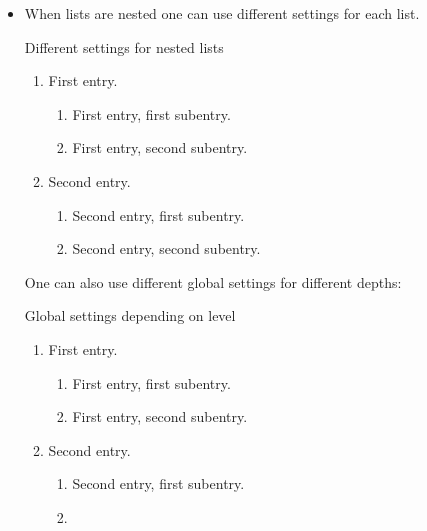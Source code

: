 \begin{itemize}
    Consider the following example:
    \begin{showlatex}*{Global settings for list environments}
\begin{enumerate}
  \item
    First entry.
  \item
    Second entry.
\end{enumerate}
    \end{showlatex}
  \item
    When lists are nested one can use different settings for each list.
    \begin{showlatex}{Different settings for nested lists}
\begin{enumerate}[label = \Roman*)]
  \item
    First entry.
    \begin{enumerate}[label = \alph*)]
      \item
        First entry, first subentry.
      \item
        First entry, second subentry.
    \end{enumerate}
  \item
    Second entry.
    \begin{enumerate}[label = \arabic*)]
      \item
        Second entry, first subentry.
      \item
        Second entry, second subentry.
    \end{enumerate}
\end{enumerate}
    \end{showlatex}
    One can also use different global settings for different depths:
    \begin{showlatex}{Global settings depending on level}
\begin{enumerate}
  \item
    First entry.
    \begin{enumerate}
      \item
        First entry, first subentry.
      \item
        First entry, second subentry.
    \end{enumerate}
  \item
    Second entry.
    \begin{enumerate}
      \item
        Second entry, first subentry.
      \item

\end{enumerate}
\end{enumerate}
\end{showlatex}
\end{itemize}
